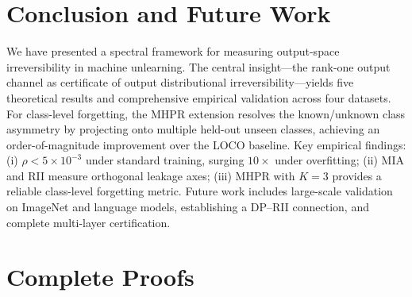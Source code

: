 \documentclass[journal]{IEEEtran}
\theoremstyle{definition}
\begin{document}
\section{Conclusion and Future Work}
\label{sec:conclusion}

We have presented a spectral framework for measuring output-space irreversibility in machine unlearning. The central insight---the rank-one output channel as certificate of output distributional irreversibility---yields five theoretical results and comprehensive empirical validation across four datasets. For class-level forgetting, the MHPR extension resolves the known/unknown class asymmetry by projecting onto multiple held-out unseen classes, achieving an order-of-magnitude improvement over the LOCO baseline. Key empirical findings: (i) $\rho < 5\times 10^{-3}$ under standard training, surging $10\times$ under overfitting; (ii) MIA and RII measure orthogonal leakage axes; (iii) MHPR with $K=3$ provides a reliable class-level forgetting metric. Future work includes large-scale validation on ImageNet and language models, establishing a DP--RII connection, and complete multi-layer certification.

\appendix
\section{Complete Proofs}
\label{sec:appendix}
\end{document}
